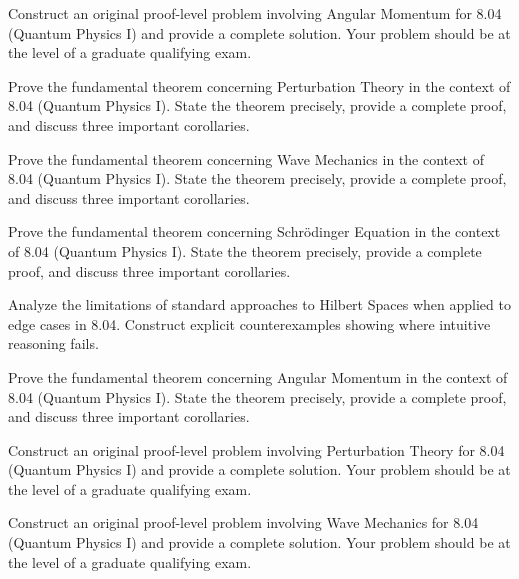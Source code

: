 \documentclass[12pt,a4paper]{exam}
\begin{document}
\begin{questions}
\vspace{0.3cm}

\question[2]
Construct an original proof-level problem involving Angular Momentum for 8.04 (Quantum Physics I) and provide a complete solution. Your problem should be at the level of a graduate qualifying exam.

\vspace{0.3cm}

\question[4]
Prove the fundamental theorem concerning Perturbation Theory in the context of 8.04 (Quantum Physics I). State the theorem precisely, provide a complete proof, and discuss three important corollaries.

\vspace{0.3cm}

\question[3]
Prove the fundamental theorem concerning Wave Mechanics in the context of 8.04 (Quantum Physics I). State the theorem precisely, provide a complete proof, and discuss three important corollaries.

\vspace{0.3cm}

\question[2]
Prove the fundamental theorem concerning Schrödinger Equation in the context of 8.04 (Quantum Physics I). State the theorem precisely, provide a complete proof, and discuss three important corollaries.

\vspace{0.3cm}

\question[3]
Analyze the limitations of standard approaches to Hilbert Spaces when applied to edge cases in 8.04. Construct explicit counterexamples showing where intuitive reasoning fails.

\vspace{0.3cm}

\question[5]
Prove the fundamental theorem concerning Angular Momentum in the context of 8.04 (Quantum Physics I). State the theorem precisely, provide a complete proof, and discuss three important corollaries.

\vspace{0.3cm}

\question[6]
Construct an original proof-level problem involving Perturbation Theory for 8.04 (Quantum Physics I) and provide a complete solution. Your problem should be at the level of a graduate qualifying exam.

\vspace{0.3cm}

\question[2]
Construct an original proof-level problem involving Wave Mechanics for 8.04 (Quantum Physics I) and provide a complete solution. Your problem should be at the level of a graduate qualifying exam.


\end{questions}
\end{document}
